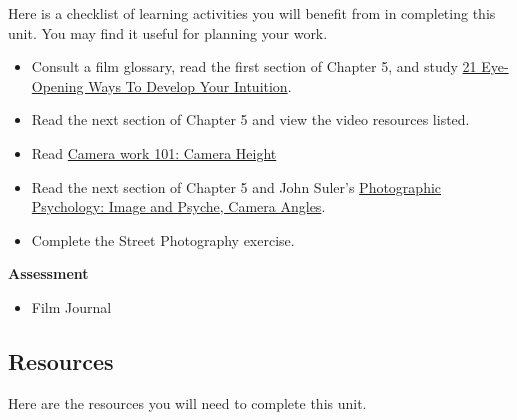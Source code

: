 \documentclass[
]{book}
\providecommand{\tightlist}{%
  \setlength{\itemsep}{0pt}\setlength{\parskip}{0pt}}
\begin{document}
\begin{reflect}
Here is a checklist of learning activities you will benefit from in completing this unit. You may find it useful for planning your work.

\begin{itemize}
\tightlist
\item
  Consult a film glossary, read the first section of Chapter 5, and study \href{https://liveboldandbloom.com/04/self-improvement/develop-your-intuition}{21 Eye-Opening Ways To Develop Your Intuition}.\\
\item
  Read the next section of Chapter 5 and view the video resources listed.\\
\item
  Read \href{http://timurcivan.com/2015/02/camera-work-101-camera-height/}{Camera work 101: Camera Height}
\item
  Read the next section of Chapter 5 and John Suler's \href{http://truecenterpublishing.com/photopsy/camera_angles.htm}{Photographic Psychology: Image and Psyche, Camera Angles}.\\
\item
  Complete the Street Photography exercise.
\end{itemize}

\textbf{Assessment}

\begin{itemize}
\tightlist
\item
  Film Journal
\end{itemize}
\end{reflect}

\hypertarget{resources-4}{%
\subsection*{Resources}\label{resources-4}}

Here are the resources you will need to complete this unit.
\end{document}
